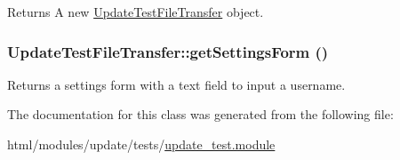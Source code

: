 \begin{DoxyReturn}{Returns}
A new \hyperlink{classUpdateTestFileTransfer}{UpdateTestFileTransfer} object. 
\end{DoxyReturn}
\hypertarget{classUpdateTestFileTransfer_a0c87952e9cff04813489db3764c9ce27}{
\subsubsection[{getSettingsForm}]{\setlength{\rightskip}{0pt plus 5cm}UpdateTestFileTransfer::getSettingsForm ()}}
\label{classUpdateTestFileTransfer_a0c87952e9cff04813489db3764c9ce27}
Returns a settings form with a text field to input a username. 

The documentation for this class was generated from the following file:\begin{DoxyCompactItemize}
\item 
html/modules/update/tests/\hyperlink{update__test_8module}{update\_\-test.module}\end{DoxyCompactItemize}
